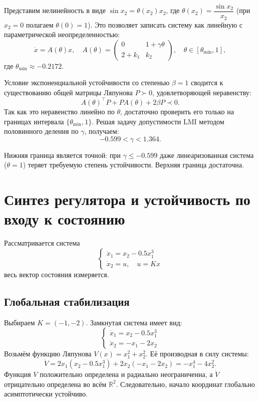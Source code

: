\documentclass[12pt,a4paper]{article}
\begin{document}
Представим нелинейность в виде $\sin x_2 = \theta(x_2) x_2$, где $\theta(x_2) = \dfrac{\sin x_2}{x_2}$ (при $x_2=0$ полагаем $\theta(0)=1$). Это позволяет записать систему как линейную с параметрической неопределенностью:
\[
\dot x = A(\theta)x, \quad A(\theta) = \begin{pmatrix} 0 & 1+\gamma\theta \\ 2+k_1 & k_2 \end{pmatrix}, \quad \theta \in [\theta_{\min}, 1],
\]
где $\theta_{\min} \approx -0.2172$.

Условие экспоненциальной устойчивости со степенью $\beta=1$ сводится к существованию общей матрицы Ляпунова $P \succ 0$, удовлетворяющей неравенству:
\[
A(\theta)^\top P + P A(\theta) + 2\beta P \prec 0.
\]
Так как это неравенство линейно по $\theta$, достаточно проверить его только на границах интервала $\{\theta_{\min}, 1\}$. Решая задачу допустимости LMI методом половинного деления по $\gamma$, получаем:
\[
-0.599 < \gamma < 1.364.
\]

Нижняя граница является точной: при $\gamma \le -0.599$ даже линеаризованная система ($\theta=1$) теряет требуемую степень устойчивости. Верхняя граница достаточна.
	
\newpage
\section{Синтез регулятора и устойчивость по входу к состоянию}

Рассматривается система
\[
\begin{cases} 
	\dot x_1 = x_2 - 0.5x_1^3 \\ 
	\dot x_2 = u, \quad u = Kx 
\end{cases}
\]
весь вектор состояния измеряется.

\subsection{Глобальная стабилизация}
Выбираем $K = (-1, -2)$. Замкнутая система имеет вид:
\[
\begin{cases} 
	\dot x_1 = x_2 - 0.5x_1^3 \\ 
	\dot x_2 = -x_1 - 2x_2 
\end{cases}
\]
Возьмём функцию Ляпунова $V(x) = x_1^2 + x_2^2$. Её производная в силу системы:
\[
\dot V = 2x_1(x_2 - 0.5x_1^3) + 2x_2(-x_1 - 2x_2) = -x_1^4 - 4x_2^2.
\]
Функция $V$ положительно определена и радиально неограниченна, а $\dot V$ отрицательно определена во всём $\mathbb{R}^2$. Следовательно, начало координат глобально асимптотически устойчиво.
\end{document}
